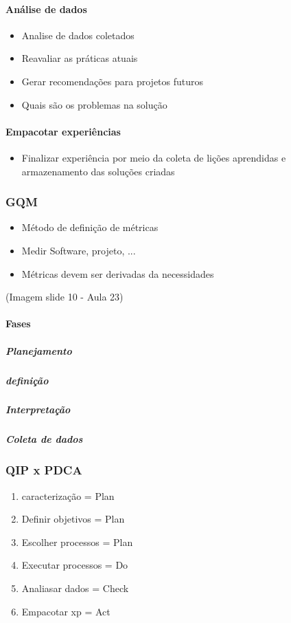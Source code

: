 \documentclass{article}
\begin{document}
\paragraph{Análise de dados}

	\begin{itemize}
	\item Analise de dados coletados
	\item Reavaliar as práticas atuais
	\item Gerar recomendações para projetos futuros
	\item Quais são os problemas na solução	
	\end{itemize}
\paragraph{Empacotar experiências}

	\begin{itemize}
	\item Finalizar experiência por meio da coleta de lições aprendidas e armazenamento das soluções criadas
	\end{itemize}
	
	
\subsubsection{GQM}

	\begin{itemize}
	\item Método de definição de métricas
	\item Medir Software, projeto, ...
	\item Métricas devem ser derivadas da necessidades 
	\end{itemize}	
	
	(Imagem slide 10 - Aula 23)
	
\paragraph{Fases}
	\subparagraph{Planejamento}
	\subparagraph{definição}			
	\subparagraph{Interpretação}			
	\subparagraph{Coleta de dados}			

\subsubsection{QIP x PDCA}

	\begin{enumerate}
	\item caracterização = Plan
	\item Definir objetivos = Plan
	\item Escolher processos = Plan
	\item Executar processos = Do
	\item Analiasar dados = Check
	\item Empacotar xp = Act
	\end{enumerate}
\end{document}
